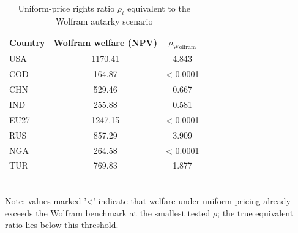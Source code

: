 \begin{table}[h]
\centering
\small
\caption{Uniform-price rights ratio $\rho_i$ equivalent to the Wolfram autarky scenario}
\renewcommand{\arraystretch}{1.2}
\begin{tabular}{lcc}
  \toprule
  \textbf{Country} & \textbf{Wolfram welfare (NPV)} & $\rho_{\text{Wolfram}}$ \\
  \midrule
  USA & 1170.41 & 4.843 \\
  COD & 164.87 & < 0.0001 \\
  CHN & 529.46 & 0.667 \\
  IND & 255.88 & 0.581 \\
  EU27 & 1247.15 & < 0.0001 \\
  RUS & 857.29 & 3.909 \\
  NGA & 264.58 & < 0.0001 \\
  TUR & 769.83 & 1.877 \\
  \bottomrule
\end{tabular}
\label{tab:wolfram_rights}
\\[4pt]
{\footnotesize Note: values marked '<' indicate that welfare under uniform pricing already exceeds the Wolfram benchmark at the smallest tested $\rho$; the true equivalent ratio lies below this threshold.}
\end{table}
